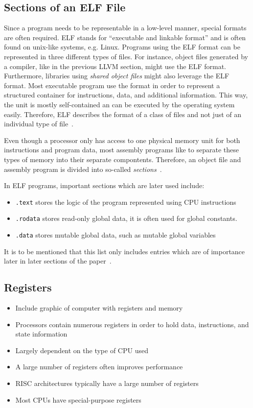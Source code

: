 \subsection{Sections of an ELF File}
Since a program needs to be representable in a low-level manner, special formats are often required.
ELF stands for \enquote{executable and linkable format} and is often found on unix-like systems, e.g. Linux.
Programs using the ELF format can be represented in three different types of files.
For instance, object files generated by a compiler, like in the previous LLVM section, might use the ELF format.
Furthermore, libraries using \emph{shared object files} might also leverage the ELF format.
Most executable program use the format in order to represent a structured container for instructions, data, and additional information.
This way, the unit is mostly self-contained an can be executed by the operating system easily.
Therefore, ELF describes the format of a class of files and not just of an individual type of file~\cite[p.~74-76]{Zhirkov2017-wk}.

Even though a processor only has access to one physical memory unit for both instructions and program data,
most assembly programs like to separate these types of memory into their separate compontents.
Therefore, an object file and assembly program is divided into so-called \emph{sections}~\cite[p.~19]{Zhirkov2017-wk}.

In ELF programs, important sections which are later used include:
\begin{itemize}
    \item \texttt{.text} stores the logic of the program represented using CPU instructions
    \item \texttt{.rodata} stores read-only global data, it is often used for global constants.
    \item \texttt{.data} stores mutable global data, such as mutable global variables
\end{itemize}

It is to be mentioned that this list only includes entries which are of importance later in later sections of the paper~\cite[p.~76]{Zhirkov2017-wk}.

\subsection{Registers}

\begin{itemize}
    \item Include graphic of computer with registers and memory
    \item Processors contain numerous registers in order to hold data, instructions, and state information 
    \item Largely dependent on the type of CPU used
    \item A large number of registers often improves performance
    \item RISC architectures typically have a large number of registers
    \item Most CPUs have special-purpose registers
\end{itemize}

